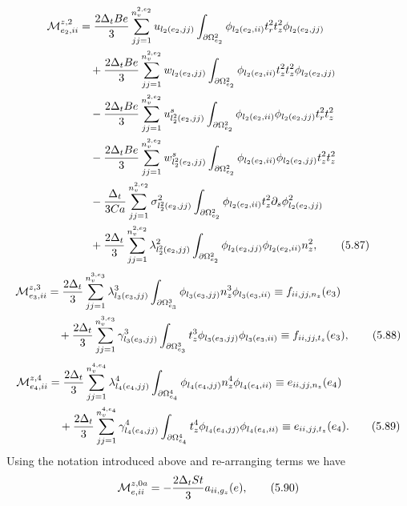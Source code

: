 \documentclass{article}
\begin{document}
\begin{align}
\mathcal{M}_{e_2,ii}^{z,2} &= \frac{2\Delta_t Be}{3} \sum_{jj=1}^{n_v^{2,e_2}} u_{l_2(e_2,jj)} \int_{\partial \Omega_{e_2}^2} \phi_{l_2(e_2,ii)} t_r^2 t_z^2 \phi_{l_2(e_2,jj)} \nonumber\\
&\quad + \frac{2\Delta_t Be}{3} \sum_{jj=1}^{n_v^{2,e_2}} w_{l_2(e_2,jj)} \int_{\partial \Omega_{e_2}^2} \phi_{l_2(e_2,ii)} t_z^2 t_z^2 \phi_{l_2(e_2,jj)} \nonumber\\
&\quad - \frac{2\Delta_t Be}{3} \sum_{jj=1}^{n_v^{2,e_2}} u_{l_2^2(e_2,jj)}^s \int_{\partial \Omega_{e_2}^2} \phi_{l_2(e_2,ii)} \phi_{l_2(e_2,jj)} t_r^2 t_z^2 \nonumber\\
&\quad - \frac{2\Delta_t Be}{3} \sum_{jj=1}^{n_v^{2,e_2}} w_{l_2^2(e_2,jj)}^s \int_{\partial \Omega_{e_2}^2} \phi_{l_2(e_2,ii)} \phi_{l_2(e_2,jj)} t_z^2 t_z^2 \nonumber\\
&\quad - \frac{\Delta_t}{3Ca} \sum_{jj=1}^{n_v^{2,e_2}} \sigma_{l_2^2(e_2,jj)}^2 \int_{\partial \Omega_{e_2}^2} \phi_{l_2(e_2,ii)} t_z^2 \partial_s \phi_{l_2(e_2,jj)}^2 \nonumber\\
&\quad + \frac{2\Delta_t}{3} \sum_{jj=1}^{n_v^{2,e_2}} \lambda_{l_2^2(e_2,jj)}^2 \int_{\partial \Omega_{e_2}^2} \phi_{l_2(e_2,jj)} \phi_{l_2(e_2,ii)} n_z^2, \tag{5.87}
\end{align}
\begin{align}
\mathcal{M}_{e_3,ii}^{z,3} &= \frac{2\Delta_t}{3} \sum_{jj=1}^{n_v^{3,e_3}} \lambda_{l_3(e_3,jj)}^3 \int_{\partial \Omega_{e_3}^3} \phi_{l_3(e_3,jj)} n_z^3 \phi_{l_3(e_3,ii)} \equiv f_{ii,jj,n_z}(e_3) \nonumber\\
&\quad + \frac{2\Delta_t}{3} \sum_{jj=1}^{n_v^{3,e_3}} \gamma_{l_3(e_3,jj)}^3 \int_{\partial \Omega_{e_3}^3} t_z^3 \phi_{l_3(e_3,jj)} \phi_{l_3(e_3,ii)} \equiv f_{ii,jj,t_z}(e_3), \tag{5.88}
\end{align}
\begin{align}
\mathcal{M}_{e_4,ii}^{z,4} &= \frac{2\Delta_t}{3} \sum_{jj=1}^{n_v^{4,e_4}} \lambda_{l_4(e_4,jj)}^4 \int_{\partial \Omega_{e_4}^4} \phi_{l_4(e_4,jj)} n_z^4 \phi_{l_4(e_4,ii)} \equiv e_{ii,jj,n_z}(e_4) \nonumber\\
&\quad + \frac{2\Delta_t}{3} \sum_{jj=1}^{n_v^{4,e_4}} \gamma_{l_4(e_4,jj)}^4 \int_{\partial \Omega_{e_4}^4} t_z^4 \phi_{l_4(e_4,jj)} \phi_{l_4(e_4,ii)} \equiv e_{ii,jj,t_z}(e_4). \tag{5.89}
\end{align}
Using the notation introduced above and re-arranging terms we have
\begin{equation}
\mathcal{M}_{e,ii}^{z,0a} = -\frac{2\Delta_t St}{3} a_{ii,g_z}(e), \tag{5.90}
\end{equation}
\end{document}
